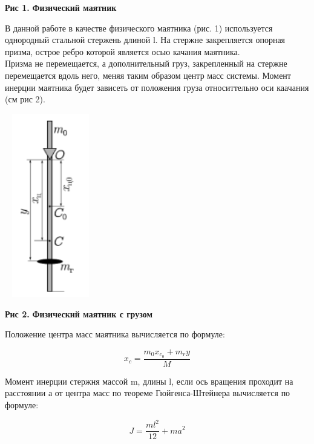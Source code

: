 \begin{flushright}
{\scriptsize \textbf{Рис 1.} \textbf {Физический маятник}}
\end{flushright}

    
    В данной работе в качестве физического маятника (рис. 1)
    используется однородный стальной стержень длиной l. На
    стержне закрепляется опорная призма, острое ребро которой
    является осью качания маятника.\\
    Призма не перемещается, а дополнительный груз, закрепленный на стержне перемещается вдоль него, меняя таким образом центр масс системы. Момент инерции маятника будет зависеть от положения груза относиттельно оси каачания (см рис 2).\\
    
\begin{center}
\includegraphics[width=4cm, height=8cm]{phys_mayat_2}
\end{center}

\begin{flushright}
{\scriptsize \textbf{Рис 2.} \textbf {Физический маятник с грузом}}
\end{flushright}
    
    Положение центра масс маятника вычисляется по формуле:

\begin{equation} \label{центр масс}
    x_{c} = \frac{m_{0}x_{c_0} + m_{r}y}{M}
\end{equation}


    Момент инерции стержня массой m, длины l, если ось вращения проходит на расстоянии а от центра масс по теореме Гюйгенса-Штейнера вычисляется по формуле:
    
\begin{equation} \label{момент инерции}
    J = \frac{ml^2}{12} + ma^2
\end{equation}

